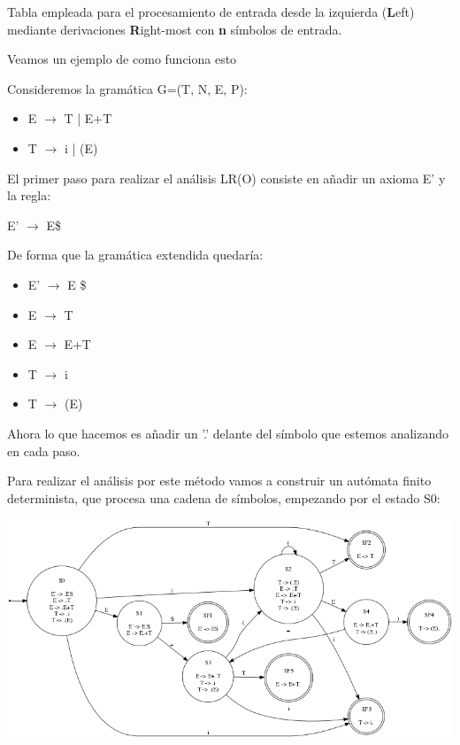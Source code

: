 \documentclass{apuntes}
\begin{document}
\begin{defn}[Tabla LR(n)]
Tabla empleada para el procesamiento de entrada desde la izquierda (\textbf{L}eft) mediante derivaciones \textbf{R}ight-most con \textbf{n} símbolos de entrada.

\end{defn}

Veamos un ejemplo de como funciona esto
\begin{example}
Consideremos la gramática G=(T, N, E, P):
\begin{itemize}
\item E $\rightarrow$ T | E+T
\item T $\rightarrow$ i | (E)
\end{itemize}

El primer paso para realizar el análisis LR(O) consiste en añadir un axioma E' y la regla:
\begin{center}
E' $\rightarrow$ E\$
\end{center}

De forma que la gramática extendida quedaría:
\begin{itemize}
\item E' $\rightarrow$ E \$
\item E $\rightarrow$ T
\item E $\rightarrow$ E+T
\item T $\rightarrow$ i
\item T $\rightarrow$ (E)
\end{itemize}

Ahora lo que hacemos es añadir un '.' delante del símbolo que estemos analizando en cada paso.

Para realizar el análisis por este método vamos a construir un autómata finito determinista, que procesa una cadena de símbolos, empezando por el estado S0:

\begin{center}
\includegraphics[scale=0.65]{automata7.png}
\end{center}


\end{example}
\end{document}
